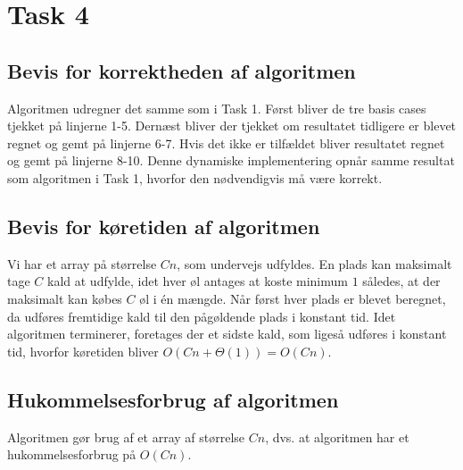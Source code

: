 \section{Task 4}
\subsection{Bevis for korrektheden af algoritmen}
Algoritmen udregner det samme som i Task 1. Først bliver de tre basis cases tjekket på linjerne 1-5. Dernæst bliver der tjekket om resultatet tidligere er blevet regnet og gemt på linjerne 6-7. Hvis det ikke er tilfældet bliver resultatet regnet og gemt på linjerne 8-10. Denne dynamiske implementering opnår samme resultat som algoritmen i Task 1, hvorfor den nødvendigvis må være korrekt. 

\subsection{Bevis for køretiden af algoritmen}

Vi har et array på størrelse $Cn$, som undervejs udfyldes.
En plads kan maksimalt tage $C$ kald at udfylde, idet hver øl antages at koste minimum $1$ således, at der maksimalt kan købes $C$ øl i én mængde. 
Når først hver plads er blevet beregnet, da udføres fremtidige kald til den pågøldende plads i konstant tid. Idet algoritmen terminerer, foretages der et sidste kald, som ligeså udføres i konstant tid, hvorfor køretiden bliver $O(Cn+\Theta(1)) = O(Cn)$.

\subsection{Hukommelsesforbrug af algoritmen}
Algoritmen gør brug af et array af størrelse $Cn$, dvs.
at algoritmen har et hukommelsesforbrug på $O(Cn)$.

